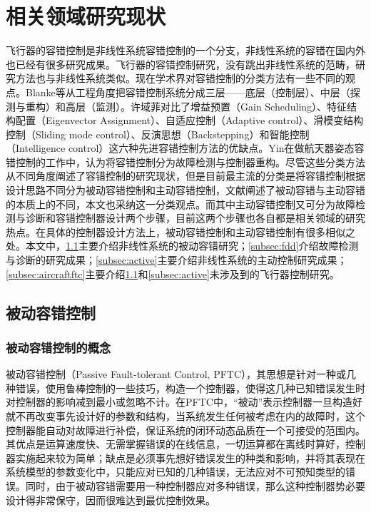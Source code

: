 \documentclass{article}
\begin{document}
\section{相关领域研究现状}
飞行器的容错控制是非线性系统容错控制的一个分支，非线性系统的容错在国内外也已经有很多研究成果。飞行器的容错控制研究，没有跳出非线性系统的范畴，研究方法也与非线性系统类似。现在学术界对容错控制的分类方法有一些不同的观点。Blanke等\cite{BLANKE1997693}从工程角度把容错控制系统分成三层——底层（控制层）、中层（探测与重构）和高层（监测）。许域菲\cite{xuyufei2011}对比了增益预置（Gain Scheduling）、特征结构配置（Eigenvector Assignment）、自适应控制（Adaptive control）、滑模变结构控制（Sliding mode control）、反演思想（Backstepping）和智能控制（Intelligence control）这六种先进容错控制方法的优缺点。Yin在做航天器姿态容错控制的工作中，认为将容错控制分为故障检测与控制器重构\cite{7407616}。尽管这些分类方法从不同角度阐述了容错控制的研究现状，但是目前最主流的分类是将容错控制根据设计思路不同分为被动容错控制和主动容错控制\cite{Zhang2008229,5160615,jiang2005fault,gaozhifeng2011,xuyufei2011,wangdejun2014}，文献\cite{Jiang201260}阐述了被动容错与主动容错的本质上的不同，本文也采纳这一分类观点。而其中主动容错控制又可分为故障检测与诊断和容错控制器设计两个步骤，目前这两个步骤也各自都是相关领域的研究热点。在具体的控制器设计方法上，被动容错控制和主动容错控制有很多相似之处。本文中，\ref{subsec:passive}主要介绍非线性系统的被动容错研究；\ref{subsec:fdd}介绍故障检测与诊断的研究成果；\ref{subsec:active}主要介绍非线性系统的主动控制研究成果；\ref{subsec:aircraftftc}主要介绍\ref{subsec:passive}和\ref{subsec:active}未涉及到的飞行器控制研究。

\subsection{被动容错控制}\label{subsec:passive}
\subsubsection{被动容错控制的概念}
被动容错控制（Passive Fault-tolerant Control, PFTC），其思想是针对一种或几种错误，使用鲁棒控制的一些技巧，构造一个控制器，使得这几种已知错误发生时对控制器的影响减到最小或忽略不计\cite{jiang2005fault,6859271}。在PFTC中，“被动”表示控制器一旦构造好就不再改变事先设计好的参数和结构，当系统发生任何被考虑在内的故障时，这个控制器能自动对故障进行补偿，保证系统的闭环动态品质在一个可接受的范围内。其优点是运算速度快、无需掌握错误的在线信息，一切运算都在离线时算好，控制器实施起来较为简单；缺点是必须事先想好错误发生的种类和影响，并将其表现在系统模型的参数变化中，只能应对已知的几种错误，无法应对不可预知类型的错误。同时，由于被动容错需要用一种控制器应对多种错误，那么这种控制器势必要设计得非常保守，因而很难达到最优控制效果\cite{jiang2005fault}。
\end{document}
